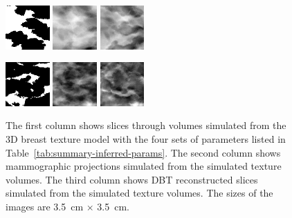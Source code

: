 \documentclass[journal]{IEEEtran}
\begin{document}
\begin{figure}[!htb]
  \includegraphics[width=0.15\textwidth]
  {figure/all/dataset_7/sim_vol_small}
  \includegraphics[width=0.15\textwidth]
  {figure/all/dataset_7/sim_proj}
  \includegraphics[width=0.15\textwidth]
  {figure/all/dataset_7/sim_recon}

  \includegraphics[width=0.15\textwidth]
  {figure/all/dataset_11/sim_vol_small}
  \includegraphics[width=0.15\textwidth]
  {figure/all/dataset_11/sim_proj}
  \includegraphics[width=0.15\textwidth]
  {figure/all/dataset_11/sim_recon}


  \caption{The first column shows slices through volumes simulated
    from the 3D breast texture model with the four sets of parameters
    listed in Table~\ref{tab:summary-inferred-params}. The second
    column shows mammographic projections simulated from the simulated
    texture volumes. The third column shows DBT reconstructed slices
    simulated from the simulated texture volumes. The sizes of the
    images are \SI{3.5}{\cm} $\times$ \SI{3.5}{\cm}.}
  \label{fig:fit-params-sims}
\end{figure}
\end{document}
